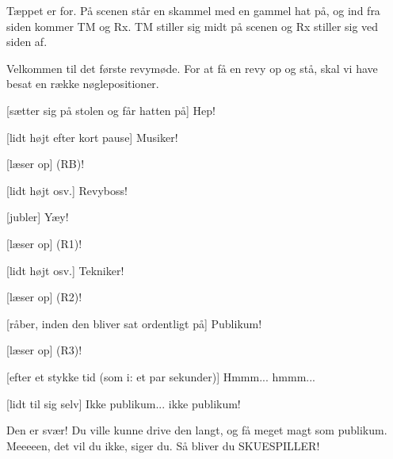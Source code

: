 \documentclass[a4paper,11pt]{article}
\begin{document}
\begin{sketch}
  
  \scene Tæppet er for. På scenen står en skammel med en gammel hat
  på, og ind fra siden kommer TM og Rx. TM stiller sig midt på scenen
  og Rx stiller sig ved siden af.


   Velkommen til det første revymøde. For at få en revy op og
  stå, skal vi have besat en række nøglepositioner. 
  
  [sætter sig på stolen og får hatten på] Hep!
  
  [lidt højt efter kort pause] Musiker!
  
  
  [læser op] (RB)! %
  
  
  [lidt højt osv.] Revyboss!
  
  [jubler] Yæy! 
  

  [læser op] (R1)! %
  
  
  [lidt højt osv.] Tekniker!
  

  [læser op] (R2)! %
  
  [råber, inden den bliver sat ordentligt på] Publikum!
  

  [læser op] (R3)! %
  
  [efter et stykke tid (som i: et par sekunder)] Hmmm...
  hmmm...
  
  [lidt til sig selv] Ikke publikum... ikke publikum!
  
   Den er svær! Du ville kunne drive den langt, og få meget
  magt som publikum. Meeeeen, det vil du ikke, siger du. Så bliver du
   SKUESPILLER!
  

\end{sketch}
\end{document}
